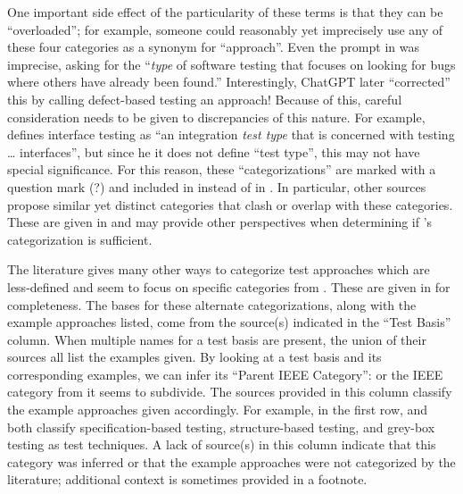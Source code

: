One important side effect of the particularity of these terms is that they can
be ``overloaded''; for example, someone could reasonably yet imprecisely use
any of these four categories as a synonym for ``approach''. Even the prompt in
\ifnotpaper \citep[emphasis added]{ChatGPT2024} \else \cite{ChatGPT2024} \fi was
imprecise, asking for the ``\emph{type} of software testing that focuses on
looking for bugs where others have already been found.'' Interestingly, ChatGPT
later ``corrected'' this by calling defect-based testing an approach!
Because of this, careful consideration needs to be given to discrepancies of
this nature. For example, \citet[p.~45\ifnotpaper, emphasis added\fi]{Kam2008}
defines interface testing as ``an integration \emph{test type} that is
concerned with testing \dots{} interfaces'', but since \ifnotpaper he \else it
\fi does not define ``test type'', this may not have special significance.
\ifnotpaper For this reason, these ``categorizations'' are marked with a
    question mark (?) and included in  instead of in
    . In particular, other sources
    \citep[such as][]{SWEBOK2024,BarbosaEtAl2006} propose similar yet distinct
    categories that clash or overlap with these categories. These are given in
     and may provide other perspectives when determining
    if \citep{IEEE2022}'s categorization is sufficient.

    The literature gives many other ways to categorize test approaches which
    are less-defined and seem to focus on specific categories from
    . These are given in  for
    completeness. The bases for these alternate categorizations, along with the
    example approaches listed, come from the source(s) indicated in the ``Test
    Basis'' column. When multiple names for a test basis are present, the union
    of their sources all list the examples given. By looking at a test basis
    and its corresponding examples, we can infer its ``Parent IEEE Category'':
    or the IEEE category from  it seems to subdivide. The
    sources provided in this column classify the example approaches given
    accordingly. For example, in the first row, \citet[pp.~4, 8]{IEEE2021} and
    \citet[p.~46]{Firesmith2015} both classify specification-based testing,
    structure-based testing, and grey-box testing as test techniques. A lack of
    source(s) in this column indicate that this category was inferred or that
    the example approaches were not categorized by the literature; additional
    context is sometimes provided in a footnote.

